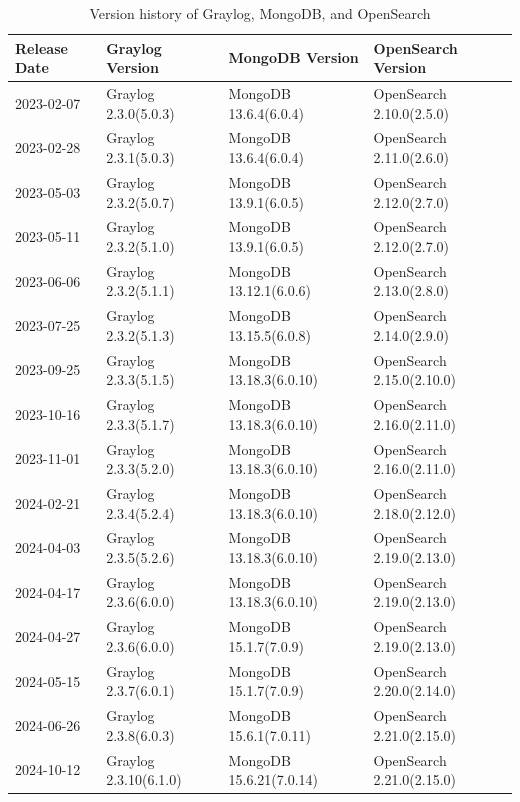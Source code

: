 \documentclass[../main.tex]{subfiles}
\begin{document}
\begin{table}[h]
    \centering
    \begin{tabular}{|l|l|l|l|}
        \hline
        \textbf{Release Date} & \textbf{Graylog Version} & \textbf{MongoDB Version} & \textbf{OpenSearch Version} \\ \hline
        2023-02-07 & Graylog 2.3.0(5.0.3) & MongoDB 13.6.4(6.0.4) & OpenSearch 2.10.0(2.5.0) \\
        2023-02-28 & Graylog 2.3.1(5.0.3) & MongoDB 13.6.4(6.0.4) & OpenSearch 2.11.0(2.6.0) \\
        2023-05-03 & Graylog 2.3.2(5.0.7) & MongoDB 13.9.1(6.0.5) & OpenSearch 2.12.0(2.7.0) \\
        2023-05-11 & Graylog 2.3.2(5.1.0) & MongoDB 13.9.1(6.0.5) & OpenSearch 2.12.0(2.7.0) \\
        2023-06-06 & Graylog 2.3.2(5.1.1) & MongoDB 13.12.1(6.0.6) & OpenSearch 2.13.0(2.8.0) \\
        2023-07-25 & Graylog 2.3.2(5.1.3) & MongoDB 13.15.5(6.0.8) & OpenSearch 2.14.0(2.9.0) \\
        2023-09-25 & Graylog 2.3.3(5.1.5) & MongoDB 13.18.3(6.0.10) & OpenSearch 2.15.0(2.10.0) \\
        2023-10-16 & Graylog 2.3.3(5.1.7) & MongoDB 13.18.3(6.0.10) & OpenSearch 2.16.0(2.11.0) \\
        2023-11-01 & Graylog 2.3.3(5.2.0) & MongoDB 13.18.3(6.0.10) & OpenSearch 2.16.0(2.11.0) \\
        2024-02-21 & Graylog 2.3.4(5.2.4) & MongoDB 13.18.3(6.0.10) & OpenSearch 2.18.0(2.12.0) \\
        2024-04-03 & Graylog 2.3.5(5.2.6) & MongoDB 13.18.3(6.0.10) & OpenSearch 2.19.0(2.13.0) \\
        2024-04-17 & Graylog 2.3.6(6.0.0) & MongoDB 13.18.3(6.0.10) & OpenSearch 2.19.0(2.13.0) \\
        2024-04-27 & Graylog 2.3.6(6.0.0) & MongoDB 15.1.7(7.0.9) & OpenSearch 2.19.0(2.13.0) \\
        2024-05-15 & Graylog 2.3.7(6.0.1) & MongoDB 15.1.7(7.0.9) & OpenSearch 2.20.0(2.14.0) \\
        2024-06-26 & Graylog 2.3.8(6.0.3) & MongoDB 15.6.1(7.0.11) & OpenSearch 2.21.0(2.15.0) \\
        2024-10-12 & Graylog 2.3.10(6.1.0) & MongoDB 15.6.21(7.0.14) & OpenSearch 2.21.0(2.15.0) \\
        \bottomrule
    \end{tabular}
    \caption{Version history of Graylog, MongoDB, and OpenSearch}
    \label{tab:version-history}
\end{table}
\end{document}
